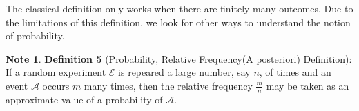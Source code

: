 \documentclass[11pt]{article}
\theoremstyle{definition}
\newtheorem{note}{Note}
\begin{document}
The classical definition only works when there are finitely many outcomes. Due to the limitations of this definition, we look for other ways to understand the notion of probability.

\begin{note}
{\textbf{Definition 5}} (Probability, Relative Frequency(A posteriori) Definition): If a random experiment $\mathscr{E}$ is repeared a large number, say $n$, of times and an event $\mathscr{A}$ occurs $m$ many times, then the relative frequency $\frac{m}{n}$ may be taken as an approximate value of a probability of $\mathscr{A}$.
\end{note}
\end{document}
